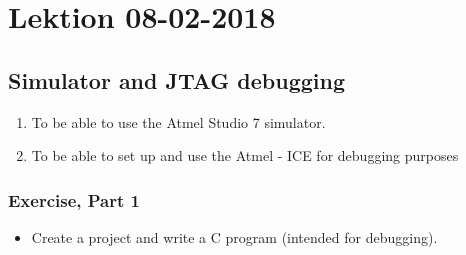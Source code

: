 \section{Lektion 08-02-2018}
\subsection{Simulator and JTAG debugging}
\begin{enumerate}
	\item To be able to use the Atmel Studio 7 simulator.
	\item To be able to set up and use the Atmel - ICE for debugging purposes
\end{enumerate}

\subsubsection{Exercise, Part 1}
\begin{itemize}
	\item Create a project and write a C program (intended for debugging).
\end{itemize}

